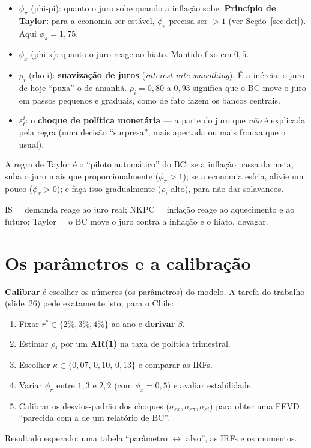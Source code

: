 \documentclass[11pt,a4paper]{article}
\begin{document}
\begin{itemize}[nosep]
  \item $\phi_\pi$ (phi-pi): quanto o juro sobe quando a inflação sobe. \textbf{Princípio de Taylor:}
        para a economia ser estável, $\phi_\pi$ precisa ser $>1$ (ver Seção~\ref{sec:det}). Aqui
        $\phi_\pi=1{,}75$.
  \item $\phi_x$ (phi-x): quanto o juro reage ao hiato. Mantido fixo em $0{,}5$.
  \item $\rho_i$ (rho-i): \textbf{suavização de juros} (\emph{interest-rate smoothing}). É a inércia: o
        juro de hoje ``puxa'' o de amanhã. $\rho_i=0{,}80$ a $0{,}93$ significa que o BC move o juro em
        passos pequenos e graduais, como de fato fazem os bancos centrais.
  \item $\varepsilon^i_t$: o \textbf{choque de política monetária} --- a parte do juro que \emph{não}
        é explicada pela regra (uma decisão ``surpresa'', mais apertada ou mais frouxa que o usual).
\end{itemize}

\begin{intuicao}
A regra de Taylor é o ``piloto automático'' do BC: se a inflação passa da meta, suba o juro mais que
proporcionalmente ($\phi_\pi>1$); se a economia esfria, alivie um pouco ($\phi_x>0$); e faça isso
gradualmente ($\rho_i$ alto), para não dar solavancos.
\end{intuicao}

\begin{resumo}
IS = demanda reage ao juro real; NKPC = inflação reage ao aquecimento e ao futuro; Taylor = o BC
move o juro contra a inflação e o hiato, devagar.
\end{resumo}

\section{Os parâmetros e a calibração}

\textbf{Calibrar} é escolher os números (os parâmetros) do modelo. A tarefa do trabalho (slide~26)
pede exatamente isto, para o Chile:

\begin{enumerate}[nosep]
  \item Fixar $r^\ast \in \{2\%,3\%,4\%\}$ ao ano e \textbf{derivar} $\beta$.
  \item Estimar $\rho_i$ por um \textbf{AR(1)} na taxa de política trimestral.
  \item Escolher $\kappa \in \{0{,}07,\,0{,}10,\,0{,}13\}$ e comparar as IRFs.
  \item Variar $\phi_\pi$ entre $1{,}3$ e $2{,}2$ (com $\phi_x=0{,}5$) e avaliar estabilidade.
  \item Calibrar os desvios-padrão dos choques ($\sigma_{\varepsilon x},\sigma_{\varepsilon \pi},
        \sigma_{\varepsilon i}$) para obter uma FEVD ``parecida com a de um relatório de BC''.
\end{enumerate}
Resultado esperado: uma tabela ``parâmetro $\leftrightarrow$ alvo'', as IRFs e os momentos.
\end{document}
